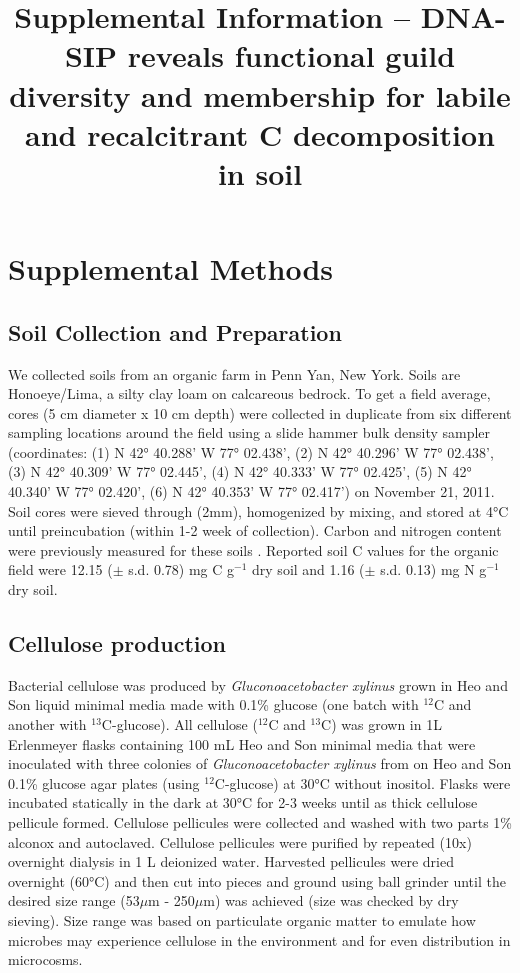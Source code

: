 \documentclass{article}
\title{Supplemental Information -- DNA-SIP reveals functional guild
diversity and membership for labile and recalcitrant C decomposition in
soil}
\date{\vspace{-5ex}}
\begin{document}
\maketitle

\tableofcontents

\listoffigures 

\listoftables

\section{Supplemental Methods}\label{SI} 

\subsection{Soil Collection and Preparation} We collected soils from an organic
farm in Penn Yan, New York. Soils are Honoeye/Lima, a silty clay loam on
calcareous bedrock. To get a field average, cores (5 cm diameter x 10 cm depth)
were collected in duplicate from six different sampling locations around the
field using a slide hammer bulk density sampler (coordinates: (1) N 42°
40.288’ W 77° 02.438’, (2) N 42° 40.296’ W 77° 02.438’, (3) N 42° 40.309’ W 77°
02.445’, (4) N 42° 40.333’ W 77° 02.425’, (5) N 42° 40.340’ W 77° 02.420’, (6)
N 42° 40.353’ W 77° 02.417’) on November 21, 2011. Soil cores were sieved
through (2mm), homogenized by mixing, and stored at 4°C until preincubation
(within 1-2 week of collection).  Carbon and nitrogen content were
previously measured for these soils \citep{Berthrong_2013}. Reported soil
C values for the organic field were 12.15 ($\pm$ s.d. 0.78) mg C g$^{-1}$
dry soil and 1.16 ($\pm$ s.d. 0.13) mg N g$^{-1}$ dry soil. 

\subsection{Cellulose production}
Bacterial cellulose was produced by \textit{Gluconoacetobacter xylinus} grown
in Heo and Son \citep{Heo_2002} liquid minimal media made with 0.1\% glucose
(one batch with $^{12}$C and another with $^{13}$C-glucose). All cellulose
($^{12}$C and $^{13}$C) was grown in 1L Erlenmeyer flasks containing 100 mL Heo
and Son minimal media that were inoculated with three colonies of
\textit{Gluconoacetobacter xylinus} from on Heo and Son 0.1\% glucose agar
plates (using $^{12}$C-glucose) at 30°C without inositol. Flasks were incubated
statically in the dark at 30°C for 2-3 weeks until as thick cellulose pellicule
formed.  Cellulose pellicules were collected and washed with two parts 1\%
alconox and autoclaved. Cellulose pellicules were purified by repeated (10x)
overnight dialysis in 1 L deionized water. Harvested pellicules were dried
overnight (60°C) and then cut into pieces and ground using ball grinder until
the desired size range (53$\mu$m - 250$\mu$m) was achieved (size was checked by
dry sieving). Size range was based on particulate organic matter to emulate how
microbes may experience cellulose in the environment \citep{Cambardella_1992}
and for even distribution in microcosms. 
\end{document}
